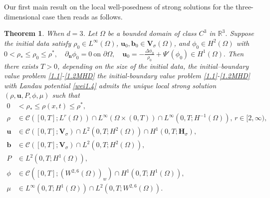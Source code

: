 \documentclass[11pt]{article}
\newtheorem{theorem}{Theorem}[section]
\numberwithin{equation}{section}
\begin{document}
Our first main result on the local well-posedness of strong solutions for the three-dimensional case then reads  as follows.
\begin{theorem}\label{1.2} When $d =3$. Let $\Omega$ be a bounded domain of class $C^3$ in $\mathbb{R}^3$.
	Suppose the initial data satisfy $\rho_0 \in L^{\infty}(\Omega)$,
	$\mathbf{u}_0, \mathbf{b}_0\in \mathbf{V}_{\sigma}(\Omega)$, and $\phi_0 \in H^2(\Omega)$ with
	$0<\rho_* \leq \rho_0 \leq \rho^*, \quad
	\partial_{\mathbf{n}} \phi_0 = 0 \ \text{on } \partial \Omega, \quad
	\mathbf{u}_0 = -\frac{\Delta \phi_0}{\rho_0} + \Psi'(\phi_0) \in H^1(\Omega).$
	Then there exists $T>0$, depending on the size of the initial data,
	the initial--boundary value problem
	\eqref{1.1}-\eqref{1.2MHD} the initial-boundary value problem
	\eqref{1.1}-\eqref{1.2MHD} with Landau potential \eqref{wei1.4} admits  the  unique  local strong solution
	$(\rho, \mathbf{u}, P, \phi, \mu)$ such that
	\begin{align*}
	0&<\rho_* \leq \rho(x, t) \leq \rho^*,\\
	\rho &\in \mathcal{C}([0,T]; L^r(\Omega)) \cap L^\infty(\Omega \times (0,T)) \cap L^\infty(0,T; H^{-1}(\Omega)), \,  r \in [2,\infty),\\
	\mathbf{u} &\in \mathcal{C}([0,T]; \mathbf{V}_{\sigma}) \cap L^2(0,T; H^2(\Omega)) \cap H^1(0,T; \mathbf{H}_{\sigma}), \\
\mathbf{b} &\in \mathcal{C}([0,T]; \mathbf{V}_{\sigma}) \cap L^2(0,T; H^2(\Omega)), \\
		P &\in L^2(0,T; H^1(\Omega)), \\
		\phi &\in \mathcal{C}([0,T]; (W^{2,6}(\Omega))_w) \cap H^1(0,T; H^1(\Omega)), \\
		\mu &\in L^\infty(0,T; H^1(\Omega)) \cap L^2(0,T; W^{2,6}(\Omega)).
	\end{align*}
\end{theorem}
\end{document}
